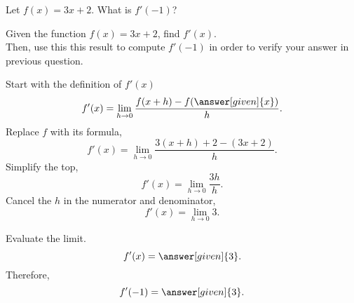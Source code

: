 \documentclass{ximera}
\begin{document}
\begin{question}
  Let $f(x) = 3x+2$. What is $f'(-1)$?
  \begin{multipleChoice}
  \end{multipleChoice}
\end{question}
\begin{example}
	Given the function $f(x) = 3x+2$, find  $f'(x)$. \\
	Then, use this this result to compute $f'(-1)$ in order to verify your answer in previous question.
	\begin{explanation}
		Start with the definition of $f'(x)$
		\[
		f'(x) = \lim_{h\to0}\frac{f(x+h)-f(\answer[given]{x})}{h}.
		\] 
		Replace $f$ with its formula,
		\[
		f'(x) = \lim_{h\to0}\frac{3(x+h)+2-(3x+2)}{h}.
		\]
		Simplify the top,
		\[
		f'(x) = \lim_{h\to0}\frac{3h}{h}.
		\]
				Cancel the $h$ in the numerator and denominator,
		\[
		f'(x) = \lim_{h\to0}3.
		\]
		
		Evaluate the limit.
		\[
		f'(x) = \answer[given]{3}.
		\]
		Therefore,
		\[
		f'(-1) = \answer[given]{3}.
		\]
	\end{explanation}
\end{example}
\end{document}
